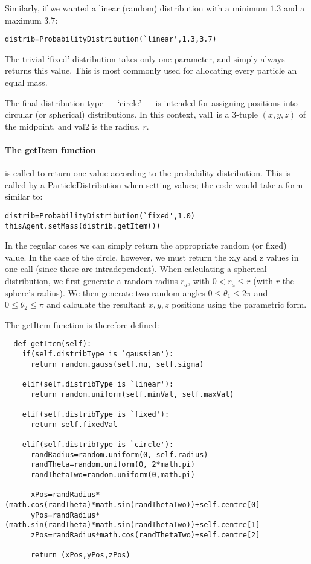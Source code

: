 \documentclass[11pt,a4paper]{article}
\begin{document}
Similarly, if we wanted a linear (random) distribution with a minimum $1.3$ and a maximum $3.7$:
\begin{lstlisting}
distrib=ProbabilityDistribution(`linear',1.3,3.7)
\end{lstlisting}

The trivial `fixed' distribution takes only one parameter, and simply always returns this value. This is most commonly used for allocating every particle an equal mass.

The final distribution type --- `circle' --- is intended for assigning positions into circular (or spherical) distributions. In this context, val1 is a 3-tuple $(x,y,z)$ of the midpoint, and val2 is the radius, $r$.

\paragraph{The getItem function} is called to return one value according to the probability distribution. This is called by a ParticleDistribution when setting values; the code would take a form similar to:

\begin{lstlisting}
distrib=ProbabilityDistribution(`fixed',1.0)
thisAgent.setMass(distrib.getItem())
\end{lstlisting}

In the regular cases we can simply return the appropriate random (or fixed) value. In the case of the circle, however, we must return the x,y and z values in one call (since these are intradependent). When calculating a spherical distribution, we first generate a random radius $r_{a}$, with $0<r_{a}\leq r$ (with $r$ the sphere's radius). We then generate two random angles $0\leq\theta_{1}\leq2\pi$ and $0\leq\theta_{2}\leq\pi$ and calculate the resultant $x,y,z$ positions using the parametric form.

The getItem function is therefore defined:

\begin{lstlisting}
  def getItem(self):
    if(self.distribType is `gaussian'):
      return random.gauss(self.mu, self.sigma)

    elif(self.distribType is `linear'):
      return random.uniform(self.minVal, self.maxVal)

    elif(self.distribType is `fixed'):
      return self.fixedVal

    elif(self.distribType is `circle'):
      randRadius=random.uniform(0, self.radius)
      randTheta=random.uniform(0, 2*math.pi)
      randThetaTwo=random.uniform(0,math.pi)
      
      xPos=randRadius*(math.cos(randTheta)*math.sin(randThetaTwo))+self.centre[0]
      yPos=randRadius*(math.sin(randTheta)*math.sin(randThetaTwo))+self.centre[1]
      zPos=randRadius*math.cos(randThetaTwo)+self.centre[2]

      return (xPos,yPos,zPos)

\end{lstlisting}
\end{document}
